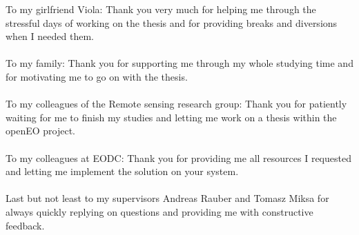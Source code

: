 \documentclass[draft,final]{vutinfth} %
\begin{document}
\frontmatter %

\addstatementpage




\begin{acknowledgements*}
To my girlfriend Viola: Thank you very much for helping me through the stressful days of working on the thesis and for providing breaks and diversions when I needed them.\\ \\
To my family: Thank you for supporting me through my whole studying time and for motivating me to go on with the thesis. \\ \\
To my colleagues of the Remote sensing research group: Thank you for patiently waiting for me to finish my studies and letting me work on a thesis within the openEO project. \\ \\
To my colleagues at EODC: Thank you for providing me all resources I requested and letting me implement the solution on your system. \\ \\
Last but not least to my supervisors Andreas Rauber and Tomasz Miksa for always quickly replying on questions and providing me with constructive feedback. 
\end{acknowledgements*}
\end{document}
